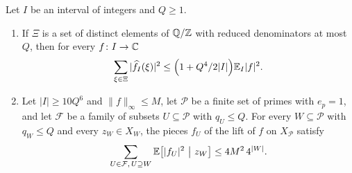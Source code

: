 \begin{lemma}
\label{lem:lift:conditional-squares}
Let $I$ be an interval of integers and $Q\ge1$.
\begin{enumerate}[label=(\alph*)]
\item If $\Xi$ is a set of distinct elements of $\mathbb Q/\mathbb Z$ with reduced
 denominators at most $Q$, then for every $f\colon I\to\mathbb C$
 \[
  \sum_{\xi\in\Xi}|\widehat f_I(\xi)|^2\le\Big(1+Q^4/2|I|\Big)\mathbb E_I|f|^2 .
 \]
\item Let $|I|\ge10Q^6$ and $\|f\|_\infty\le M$, let $\mathcal P$ be a finite
 set of primes with $e_p=1$, and let $\mathcal F$ be a family of subsets
 $U\subseteq\mathcal P$ with $q_U\le Q$. For every $W\subseteq\mathcal P$ with
 $q_W\le Q$ and every $z_W\in X_W$, the pieces $f_U$ of the lift of $f$ on
 $X_{\mathcal P}$ satisfy
 \begin{equation}\label{eq:cond-square}
  \sum_{U\in\mathcal F,\,U\supseteq W}\mathbb E\big[|f_U|^2\ \big|\ z_W\big]
  \le4M^2\,4^{|W|}.
 \end{equation}
\end{enumerate}
\end{lemma}

